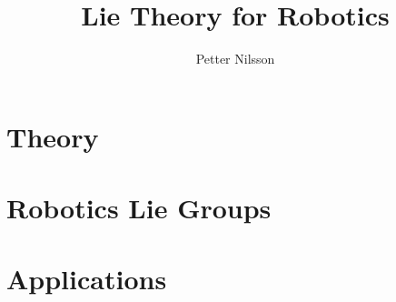 \documentclass{scrbook}
\title{Lie Theory for Robotics}
\author{Petter Nilsson}
\begin{document}
\frontmatter

\maketitle

\setcounter{tocdepth}{1}
\tableofcontents

\mainmatter



\part{Theory}










\part{Robotics Lie Groups}








\part{Applications}








\backmatter

\printbibliography

% 

\end{document}
